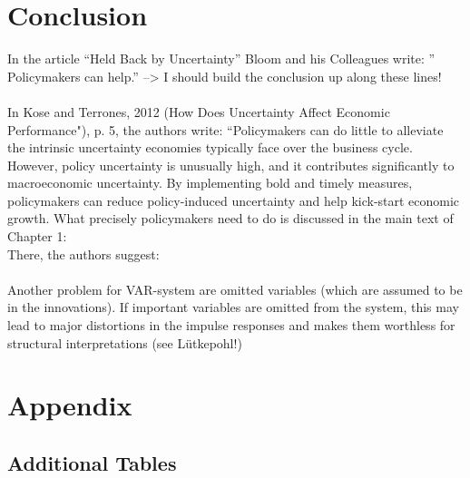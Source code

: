 \documentclass[a4paper,11pt,listof=nochaptergap,oneside,pointednumbers,bibtotoc,bigheadings,liststotoc]{scrbook}
\theoremstyle{mysatz}
\theoremstyle{mydefinition}
\theoremstyle{mybemerkung}
\begin{document}
\chapter{Conclusion}
\label{Conclusion}




In the article ``Held Back by Uncertainty'' Bloom and his Colleagues write: '' Policymakers can help.'' --> I should build the conclusion up along these lines! \\
\\
In Kose and Terrones, 2012 (How Does Uncertainty Affect Economic Performance"), p. 5, the authors write: ``Policymakers can do little to alleviate the intrinsic uncertainty economies typically face over the business cycle. However, policy uncertainty is unusually high, and it contributes significantly to macroeconomic uncertainty. By implementing bold and timely measures, policymakers can reduce policy-induced uncertainty and help kick-start economic growth. What precisely policymakers need to do is discussed in the main text of Chapter 1:\\
There, the authors suggest: 
\\
\\
Another problem for VAR-system are omitted variables (which are assumed to be in the innovations). If important variables are omitted from the system, this may lead to major distortions in the impulse responses and makes them worthless for structural interpretations (see Lütkepohl!)


\newpage
\appendix


\chapter{Appendix}
\label{VARAndLocalProjection}

\section{Additional Tables}
\label{sec:additionalTables}
\end{document}
